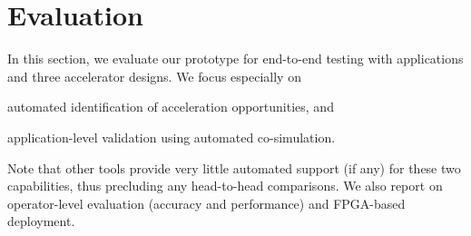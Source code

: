 \section{Evaluation}
\label{sec.eval}

In this section, 
  we evaluate our prototype 
  for end-to-end testing with \AppNum applications and three accelerator designs. We focus especially on
\begin{inlinelist}
\item automated identification of acceleration opportunities, and 
\item application-level validation using automated co-simulation.   
\end{inlinelist}
%
Note that other tools provide very little automated support (if any)
for these two capabilities, thus precluding any head-to-head comparisons. 
We also report on operator-level evaluation (accuracy and performance) and FPGA-based deployment.











